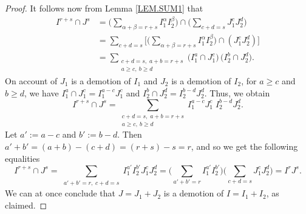 \documentclass[10pt,a4paper]{amsart}
\begin{document}
\begin{proof}
 It follows now from Lemma \ref{LEM.SUM1} that 
\[
\begin{aligned}
I^{r+s}\cap J^s
&=\Big(\sum_{\alpha+\beta=r+s} I_1^\alpha I_2^\beta\Big)\cap
\Big(\sum_{c+d=s} J_1^cJ_2^d\Big) \\
&= \sum_{c+d=s}
\Big[\Big(\sum_{\alpha+\beta=r+s} I_1^\alpha I_2^\beta\Big)\cap (J_1^cJ_2^d)\Big] \\
&= \sum_{\substack{c+d=s,\; a+b=r+s\\ a\ge c,\ b\ge d}}
\big(I_1^{a}\cap J_1^c\big)\,\big(I_2^{b}\cap J_2^d\big).
\end{aligned}
\]
On account of  $J_1$ is a demotion of $I_1$ and $J_2$ is a demotion of $I_2$, for $a\ge c$ and $b\ge d$,  we have
$I_1^{a}\cap J_1^c = I_1^{a-c}J_1^c$ and $I_2^{b}\cap J_2^d = I_2^{b-d}J_2^d$. 
Thus, we obtain
\[
I^{r+s}\cap J^s = \sum_{\substack{c+d=s,\; a+b=r+s\\ a\ge c,\ b\ge d}}
I_1^{a-c}J_1^c \; I_2^{b-d}J_2^d.
\]
Let $a':=a-c$ and $b':=b-d$. Then $a'+b'=(a+b)-(c+d)=(r+s)-s=r$, and so we get the following equalities 
\[
I^{r+s}\cap J^s = \sum_{\substack{a'+b'=r, \; c+d=s}}
I_1^{a'}I_2^{b'}  J_1^cJ_2^d
=\Big(\sum_{a'+b'=r} I_1^{a'}I_2^{b'}\Big)
\Big(\sum_{c+d=s} J_1^cJ_2^d\Big)
= I^rJ^s.
\]
We can at once  conclude that   \(J = J_1 + J_2\) is a demotion of \(I = I_1 + I_2\), as claimed. 
\end{proof}
\end{document}
